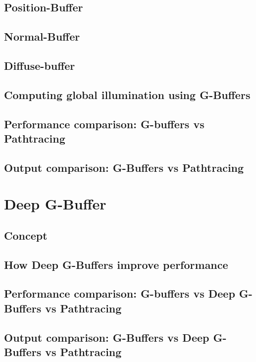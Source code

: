 \documentclass{ACGSeminar}
\begin{document}
	\subsection{Position-Buffer}
	\subsection{Normal-Buffer}
	\subsection{Diffuse-buffer}
	\subsection{Computing global illumination using G-Buffers}
	\subsection{Performance comparison: G-buffers vs Pathtracing}
	\subsection{Output comparison: G-Buffers vs Pathtracing}

\section{Deep G-Buffer}
	\subsection{Concept}
	\subsection{How Deep G-Buffers improve performance}
	\subsection{Performance comparison: G-buffers vs Deep G-Buffers vs Pathtracing}
	\subsection{Output comparison: G-Buffers vs Deep G-Buffers vs Pathtracing}

%

\label{cha:references}
\printbibliography
\end{document}
